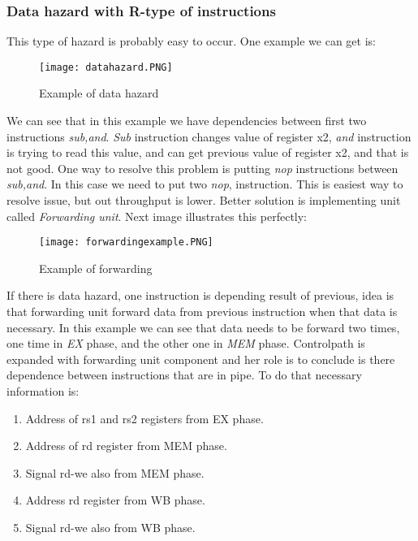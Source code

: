 \documentclass{scrreprt}
\begin{document}
        \subsubsection*{Data hazard with R-type of instructions}
            This type of hazard is probably easy to occur. One example we can get is:
            \begin{figure}[htb!]
                \centering
                \texttt{[image: datahazard.PNG]}
                \caption{Example of data hazard}
                \label{fig:datahazard}
            \end{figure}
            \hfill \break
            We can see that in this example we have dependencies between first two instructions \textit{sub,and}. \textit{Sub} instruction changes value of register x2, \textit{and} instruction is trying to read this value, and can get previous value of register x2, and that is not good. 
            One way to resolve this problem is putting \textit{nop} instructions between \textit{sub,and}. In this case we need to put two \textit{nop}, instruction. This is easiest way to resolve issue, but out throughput is lower. Better solution is implementing unit called \textit{Forwarding unit}. Next image illustrates this perfectly:
            \begin{figure}[htb!]
                \centering
                \texttt{[image: forwardingexample.PNG]}
                \caption{Example of forwarding}
                \label{fig:Forwardingunit}
            \end{figure}
            \newpage
            If there is data hazard, one instruction is depending result of previous, idea is that forwarding unit forward data from previous instruction when that data is necessary. In this example we can see that data needs to be forward two times, one time in \textit{EX} phase, and the other one in \textit{MEM} phase. 
            \hfill \break
            Controlpath is expanded with forwarding unit component and her role is to conclude is there dependence between instructions that are in pipe. To do that necessary information is:
            \begin{enumerate}
                \item Address of rs1 and rs2 registers from EX phase.  
                \item Address of rd register from MEM phase. 
                \item Signal rd-we also from MEM phase. 
                \item Address rd register from WB phase.
                \item Signal rd-we also from WB phase. 
            \end{enumerate}
\end{document}
